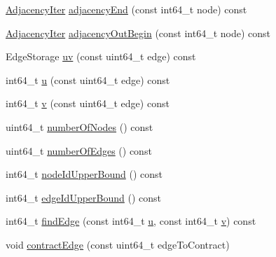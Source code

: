 \begin{DoxyCompactItemize}
\item 
\hyperlink{classnifty_1_1graph_1_1EdgeContractionGraphWithSets_ab4782e97223ab8ba2d207325aae693d6}{Adjacency\+Iter} \hyperlink{classnifty_1_1graph_1_1EdgeContractionGraphWithSets_a1d8876f14af17d956c0803d5703227af}{adjacency\+End} (const int64\+\_\+t node) const
\item 
\hyperlink{classnifty_1_1graph_1_1EdgeContractionGraphWithSets_ab4782e97223ab8ba2d207325aae693d6}{Adjacency\+Iter} \hyperlink{classnifty_1_1graph_1_1EdgeContractionGraphWithSets_af9d9cd7de8303720e60f85ae4370d9ac}{adjacency\+Out\+Begin} (const int64\+\_\+t node) const
\item 
Edge\+Storage \hyperlink{classnifty_1_1graph_1_1EdgeContractionGraphWithSets_a0edbec99d4a3354b0f507d0f59d89c77}{uv} (const uint64\+\_\+t edge) const
\item 
int64\+\_\+t \hyperlink{classnifty_1_1graph_1_1EdgeContractionGraphWithSets_abf5d1c2ca6d161d889b99aa1f845b320}{u} (const uint64\+\_\+t edge) const
\item 
int64\+\_\+t \hyperlink{classnifty_1_1graph_1_1EdgeContractionGraphWithSets_aeeb13117bb87989a9ace9f571b73ebca}{v} (const uint64\+\_\+t edge) const
\item 
uint64\+\_\+t \hyperlink{classnifty_1_1graph_1_1EdgeContractionGraphWithSets_a60d33d4527d49e48638a319b86cbb3d3}{number\+Of\+Nodes} () const
\item 
uint64\+\_\+t \hyperlink{classnifty_1_1graph_1_1EdgeContractionGraphWithSets_af7424aa2b0db5ed65594cf9639495ab4}{number\+Of\+Edges} () const
\item 
int64\+\_\+t \hyperlink{classnifty_1_1graph_1_1EdgeContractionGraphWithSets_acc75170fb074bdfeff10096cab3b9e44}{node\+Id\+Upper\+Bound} () const
\item 
int64\+\_\+t \hyperlink{classnifty_1_1graph_1_1EdgeContractionGraphWithSets_a3ef69f446e645b4592b05d84d47951f3}{edge\+Id\+Upper\+Bound} () const
\item 
int64\+\_\+t \hyperlink{classnifty_1_1graph_1_1EdgeContractionGraphWithSets_a75e68f303f9b241d4ffa854c65de4d50}{find\+Edge} (const int64\+\_\+t \hyperlink{classnifty_1_1graph_1_1EdgeContractionGraphWithSets_abf5d1c2ca6d161d889b99aa1f845b320}{u}, const int64\+\_\+t \hyperlink{classnifty_1_1graph_1_1EdgeContractionGraphWithSets_aeeb13117bb87989a9ace9f571b73ebca}{v}) const
\item 
void \hyperlink{classnifty_1_1graph_1_1EdgeContractionGraphWithSets_aac2039e7aa273ca72a664636284e094c}{contract\+Edge} (const uint64\+\_\+t edge\+To\+Contract)
\item 

\end{DoxyCompactItemize}
